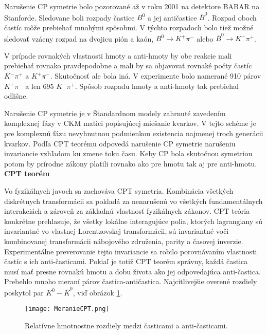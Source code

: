\documentclass[../../main.tex]{subfiles}
\begin{document}
Narušenie CP symetrie bolo pozorované až v roku 2001 na detektore BABAR na Stanforde. Sledovane boli rozpady častice $B^0$ a jej antičastice $\bar{B}^0$. Rozpad oboch častíc môže prebiehať mnohými spôsobmi. V týchto rozpadoch bolo tiež možné sledovať vzácny rozpad na dvojicu pión a kaón, $B^0 \rightarrow K^+ \pi^-$ alebo $\bar{B}^0 \rightarrow K^- \pi^+$.

V prípade rovnakých vlastnosti hmoty a anti-hmoty by obe reakcie mali prebiehať rovnako pravdepodobne a mali by sa objavovať rovnaké počty častíc $K^- \pi^+$ a $K^+ \pi^-$. Skutočnosť ale bola iná. V experimente bolo namerané 910 párov $K^+ \pi^-$ a len  695 $K^- \pi^+$. Spôsob rozpadu hmoty a anti-hmoty tak prebiehal odlišne.

Narušenie CP symetrie je v Štandardnom modely zahrnuté zavedením komplexnej fázy v CKM matici popisujúcej miešanie kvarkov. V tejto schéme je pre komplexnú fázu nevyhnutnou podmienkou existencia najmenej troch generácii kvarkov. Podľa CPT teorému odpovedá narušenie CP symetrie narušeniu invariancie vzhľadom ku zmene toku času. Keby CP bola skutočnou symetriou potom by prírodne zákony platili rovnako ako pre hmotu tak aj pre anti-hmotu.
\newline 
\textbf{CPT teorém}\par
Vo fyzikálnych javoch sa zachováva CPT symetria. Kombinácia všetkých diskrétnych transformácii sa pokladá za nenarušenú vo všetkých fundamentálnych interakciách a zároveň za základnú vlastnosť fyzikálnych zákonov. CPT teória konkrétne prehlasuje, že všetky lokálne interagujúce polia, ktorých lagrangiany sú invariantné vo vlastnej Lorentzovskej transformácii, sú invariantné voči kombinovanej transformácii nábojového združenia, parity a časovej inverzie. Experimentálne preverovanie tejto invariancie sa robilo porovnávaním vlastnosti častíc s ich anti-časticami. Pokiaľ je totiž CPT teorém správny, každá častica musí mať presne rovnakú hmotu a dobu života ako jej odpovedajúca anti-častica. Prebehlo mnoho meraní párov častica-antičastica. Najcitlivejšie overené rozdiely poskytol par $K^0-\bar{K}^0$, viď obrázok \ref{sf1:fig:MeranieCPT}.
\begin{figure}[!h]
\centering
\texttt{[image: MeranieCPT.png]}
\caption{Relatívne hmotnostne rozdiely medzi časticami a anti-časticami.}
\label{sf1:fig:MeranieCPT}
\end{figure} \newline
\end{document}
